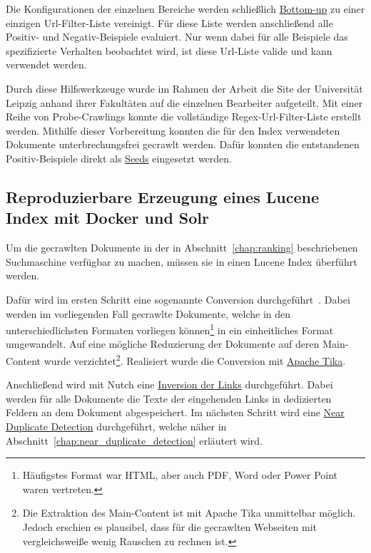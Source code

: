 Die Konfigurationen der einzelnen Bereiche werden schließlich \href{https://de.wikipedia.org/wiki/Top-down_und_Bottom-up}{Bottom-up} zu einer einzigen 
Url-Filter-Liste vereinigt.
Für diese Liste werden anschließend alle Positiv- und Negativ-Beispiele evaluiert.
Nur wenn dabei für alle Beispiele das spezifizierte Verhalten beobachtet wird, ist diese Url-Liste valide und kann verwendet werden.

Durch diese Hilfswerkzeuge wurde im Rahmen der Arbeit die Site der Universität Leipzig anhand ihrer Fakultäten auf die einzelnen Bearbeiter aufgeteilt.
Mit einer Reihe von Probe-Crawlings konnte die vollständige Regex-Url-Filter-Liste erstellt werden.
Mithilfe dieser Vorbereitung konnten die für den Index verwendeten Dokumente unterbrechungsfrei gecrawlt werden.
Dafür konnten die entstandenen Positiv-Beispiele direkt als \href{https://wiki.apache.org/nutch/NutchTutorial#Create_a_URL_seed_list-1}{Seeds} eingesetzt werden.

\subsection{Reproduzierbare Erzeugung eines Lucene Index mit Docker und Solr}

Um die gecrawlten Dokumente in der in Abschnitt~\ref{chap:ranking} beschriebenen Suchmaschine verfügbar zu machen, müssen sie in einen Lucene Index überführt werden.

Dafür wird im ersten Schritt eine sogenannte Conversion durchgeführt~\cite{croft.chap2}.
Dabei werden im vorliegenden Fall gecrawlte Dokumente,
welche in den unterschiedlichsten Formaten vorliegen können\footnote{Häufigstes Format war HTML, aber auch PDF, Word oder Power Point waren vertreten.}
in ein einheitliches Format umgewandelt.
Auf eine mögliche Reduzierung der Dokumente auf deren Main-Content wurde
verzichtet\footnote{Die Extraktion des Main-Content ist mit Apache Tika
unmittelbar möglich. Jedoch erschien es plausibel, dass für die gecrawlten Webseiten mit vergleichsweiße wenig Rauschen zu rechnen ist.}.
Realisiert wurde die Conversion mit \href{https://en.wikipedia.org/wiki/Apache_Tika}{Apache Tika}.

Anschließend wird mit Nutch eine \href{https://wiki.apache.org/nutch/bin/nutch_invertlinks}{Inversion der Links} durchgeführt.
Dabei werden für alle Dokumente die Texte der eingehenden Links in dedizierten Feldern an dem Dokument abgespeichert.
Im nächsten Schritt wird eine \href{https://github.com/apache/nutch/blob/master/src/java/org/apache/nutch/crawl/TextProfileSignature.java}{Near Duplicate Detection}
durchgeführt, welche näher in Abschnitt~\ref{chap:near_duplicate_detection} erläutert wird.

